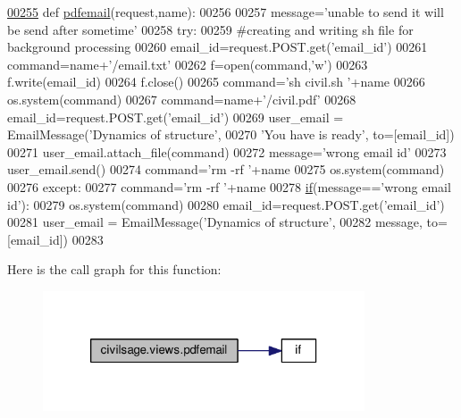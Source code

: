 \begin{DoxyCode}
\hypertarget{namespacecivilsage_1_1views_l00255}{}\hyperlink{namespacecivilsage_1_1views_a9914ff19f8e15ccab1a07eaeac8cfb21}{00255} \textcolor{keyword}{def }\hyperlink{namespacecivilsage_1_1views_a9914ff19f8e15ccab1a07eaeac8cfb21}{pdfemail}(request,name):
00256 
00257     message=\textcolor{stringliteral}{'unable to send it will be send after sometime'}
00258     \textcolor{keywordflow}{try}:
00259         \textcolor{comment}{#creating and writing sh file for background processing}
00260         email\_id=request.POST.get(\textcolor{stringliteral}{'email\_id'})
00261         command=name+\textcolor{stringliteral}{'/email.txt'}
00262         f=open(command,\textcolor{stringliteral}{'w'})
00263         f.write(email\_id)
00264         f.close()
00265         command=\textcolor{stringliteral}{'sh  civil.sh '}+name
00266         os.system(command)
00267         command=name+\textcolor{stringliteral}{'/civil.pdf'}
00268         email\_id=request.POST.get(\textcolor{stringliteral}{'email\_id'})
00269         user\_email = EmailMessage(\textcolor{stringliteral}{'Dynamics of structure'},
00270         \textcolor{stringliteral}{'You have is ready'}, to=[email\_id])
00271         user\_email.attach\_file(command)
00272         message=\textcolor{stringliteral}{'wrong email id'}
00273         user\_email.send()
00274         command=\textcolor{stringliteral}{'rm -rf '}+name
00275         os.system(command)
00276     \textcolor{keywordflow}{except}:
00277         command=\textcolor{stringliteral}{'rm -rf '}+name
00278         \hyperlink{bootstrap_8min_8js_ac2d69f5011896c6ed4a54e0dd36f6334}{if}(message==\textcolor{stringliteral}{'wrong email id'}):
00279                     os.system(command)
00280                 email\_id=request.POST.get(\textcolor{stringliteral}{'email\_id'})
00281         user\_email = EmailMessage(\textcolor{stringliteral}{'Dynamics of structure'},
00282         message, to=[email\_id])
00283 
\end{DoxyCode}


Here is the call graph for this function\+:\nopagebreak
\begin{figure}[H]
\begin{center}
\leavevmode
\includegraphics[width=270pt]{namespacecivilsage_1_1views_a9914ff19f8e15ccab1a07eaeac8cfb21_cgraph}
\end{center}
\end{figure}


